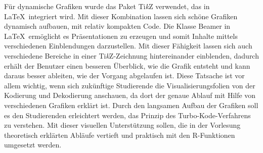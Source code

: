 Für dynamische Grafiken wurde das Paket Ti\textit{k}Z verwendet, das in \LaTeX\ integriert wird. Mit dieser Kombination lassen sich schöne Grafiken dynamisch aufbauen, mit relativ kompakten Code. Die Klasse Beamer in \LaTeX\ ermöglicht es Präsentationen zu erzeugen und somit Inhalte mittels verschiedenen Einblendungen darzustellen. Mit dieser Fähigkeit lassen sich auch verschiedene Bereiche in einer Ti\textit{k}Z-Zeichnung hintereinander einblenden, dadurch erhält der Benutzer einen besseren Überblick, wie die Grafik entsteht und kann daraus besser ableiten, wie der Vorgang abgelaufen ist. Diese Tatsache ist vor allem wichtig, wenn sich zukünftige Studierende die Visualisierungsfolien von der Kodierung und Dekodierung anschauen, da dort der genaue Ablauf mit Hilfe von verschiedenen Grafiken erklärt ist. Durch den langsamen Aufbau der Grafiken soll es den Studierenden erleichtert werden, das Prinzip des Turbo-Kode-Verfahrens zu verstehen. Mit dieser visuellen Unterstützung sollen, die in der Vorlesung theoretisch erklärten Abläufe vertieft und praktisch mit den R-Funktionen umgesetzt werden.  